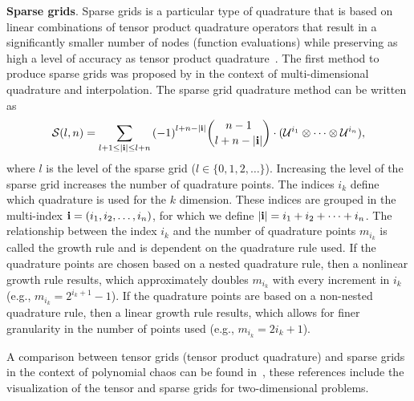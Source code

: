\textbf{Sparse grids}.
Sparse grids is a particular type of quadrature that is based on linear combinations of tensor product quadrature operators that result in a significantly smaller number of nodes (function evaluations) while preserving as high a level of accuracy as tensor product quadrature~\cite{Gerstner1998,Olivier2010}. The first method to produce sparse grids was proposed by \cite{Smolyak1963} in the context of multi-dimensional quadrature and interpolation.
The sparse grid quadrature method can be written as~\cite{Eldred2011}
\begin{equation}
  \mathcal{S}(l,n) = \sum_{l+1\leq |\mathbf{i}| \leq l+n} {(-1)}^{l+n-|\mathbf{i}|}
  \binom{n-1}{l+n-|\mathbf{i}|}\cdot (\mathcal{U}^{i_1} \otimes \cdots \otimes \mathcal{U}^{i_n}),
\end{equation}
where $l$ is the level of the sparse grid ($l \in \{0, 1 ,2 , \ldots \}$). Increasing the level of the sparse grid increases the number of quadrature points. The indices $i_k$ define which quadrature is used for the $k$ dimension. These indices are grouped in the multi-index $\mathbf{i}=(i_1,i_2,\ldots,i_n)$, for which we define $|\mathbf{i}|=i_1+i_2+ \cdots +i_n$. The relationship between the index $i_k$ and the number of quadrature points $m_{i_k}$ is called the growth rule and is dependent on the quadrature rule used. If the quadrature points are chosen based on a nested quadrature rule, then a nonlinear growth rule results, which approximately doubles $m_{i_k}$ with every increment in $i_k$ (e.g., $m_{i_k}=2^{i_k+1}-1$). If the quadrature points are based on a non-nested quadrature rule, then a linear growth rule results, which allows for finer granularity in the number of points used (e.g., $m_{i_k}=2i_k+1$).

A comparison between tensor grids (tensor product quadrature) and sparse grids in the context of polynomial chaos can be found in~\cite{Eldred2008,Smith2014}, these references include the visualization of the tensor and sparse grids for two-dimensional problems.


